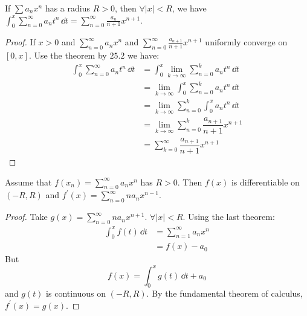 \documentclass{report}
\begin{document}
\begin{theorem}{26.4}
    If $\sum a_{n}x^{n}$ has a radius $R > 0$, then $\forall \lvert x \rvert < R$, we have $\int_{0}^{x} \sum_{n = 0}^{\infty} a_{n}t^{n} \, \dd{t} = \sum_{n = 0}^{\infty}\frac{a_{n}}{n + 1}x^{n + 1}$.
\end{theorem}
    \begin{proof}
        If $x > 0$ and $\sum_{n = 0}^{\infty} a_{n}x^{n}$ and $\sum_{n = 0}^{\infty} \frac{a_{n + 1}}{n + 1}x^{n + 1}$ uniformly converge on $[0, x]$. Use the theorem by $25.2$ we have:
            \begin{align*}
                \int_{0}^{x} \sum_{n = 0}^{\infty} a_{n}t^{n} \, \dd{t} &= \int_{0}^{x} \lim\limits_{k \to \infty} \sum_{n = 0}^{k}a_{n}t^{n} \, \dd{t}  \\
                                                                        &= \lim\limits_{k \to \infty} \int_{0}^{x} \sum_{n = 0}^{k}a_{n}t^{n} \, \dd{t} \\
                                                                        &= \lim\limits_{k \to \infty} \sum_{n = 0}^{k}\int_{0}^{x} a_{n}t^{n} \, \dd{t} \\
                                                                        &= \lim\limits_{k \to  \infty} \sum_{n = 0}^{k} \dfrac{a_{n + 1}}{n + 1}x^{n + 1} \\
                                                                        &= \sum_{k = 0}^{\infty} \dfrac{a_{n + 1}}{n + 1}x^{n + 1}
            \end{align*}
    \end{proof}

\begin{theorem}{26.5}
    Assume that $f(x_{n}) = \sum_{n = 0}^{\infty} a_{n}x^{n}$ has $R> 0$. Then $f(x)$ is differentiable on $(-R, R)$ and $f^{\prime}(x) = \sum_{n = 0}^{\infty} na_{n}x^{n - 1}$.
\end{theorem}
    \begin{proof}
        Take $g(x) = \sum_{n = 0}^{\infty} na_{n}x^{n + 1}$. $\forall \lvert x \rvert < R$. Using the last theorem:
            \begin{align*}
                 \int_{0}^{x} f(t) \, \dd{t}  &= \sum_{n = 1}^{\infty} a_{n}x^{n} \\
                                              &= f(x) - a_{0}                       
            \end{align*}
        But
            \begin{equation*}
                f(x) =  \int_{0}^{x} g(t) \, \dd{t}  + a_{0}
            \end{equation*}
        and $g(t)$ is continuous on $(-R, R)$. By the fundamental theorem of calculus, $f^{\prime}(x) = g(x)$.
    \end{proof}
\end{document}
